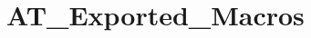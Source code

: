 \hypertarget{group___a_t___exported___macros}{}\section{A\+T\+\_\+\+Exported\+\_\+\+Macros}
\label{group___a_t___exported___macros}
